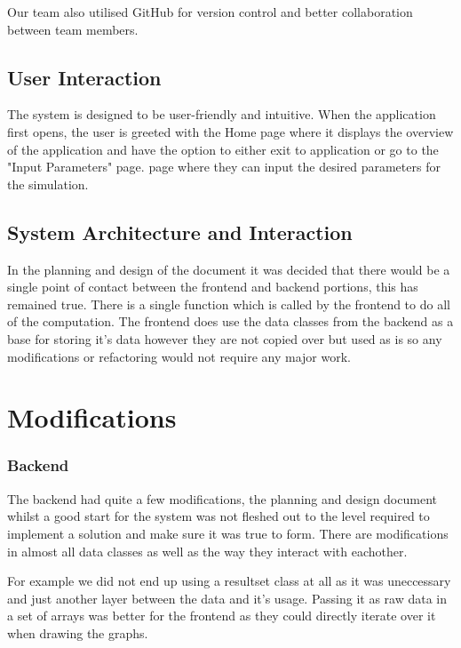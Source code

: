 \documentclass{article}
\begin{document}
    Our team also utilised GitHub for version control and better collaboration between team members.

    \subsection{User Interaction}

    The system is designed to be user-friendly and intuitive. When the application first opens, the user is greeted with the Home page where it displays the overview of the application and have the option to either exit to application or go to the "Input Parameters" page.
    page where they can input the desired parameters for the simulation.

    \subsection{System Architecture and Interaction}

    In the planning and design of the document it was decided that there would be a single point of contact between
    the frontend and backend portions, this has remained true. There is a single function which is called by the
    frontend to do all of the computation. The frontend does use the data classes from the backend as a base for
    storing it's data however they are not copied over but used as is so any modifications or refactoring would not
    require any major work.

    \section{Modifications}

    \subsubsection{Backend}

    The backend had quite a few modifications, the planning and design document whilst a good start for the system was
    not fleshed out to the level required to implement a solution and make sure it was true to form. There are modifications
    in almost all data classes as well as the way they interact with eachother.

    For example we did not end up using a resultset class at all as it was uneccessary and just another layer between
    the data and it's usage. Passing it as raw data in a set of arrays was better for the frontend as they could
    directly iterate over it when drawing the graphs.
\end{document}
